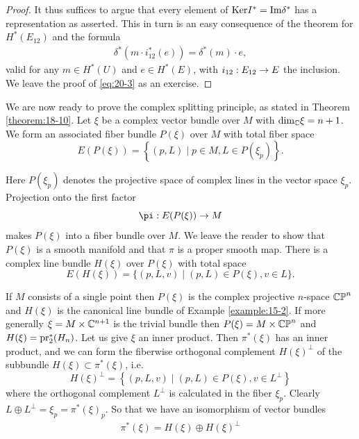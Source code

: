 \begin{proof}
  It thus suffices to argue that every element of $\mathrm{Ker}{I}^* = \mathrm{Im}{\delta }^*$ has 
  a representation as asserted. This in turn is an easy consequence of the theorem for $H^*( E_{12})$ 
  and the formula
  \begin{align}\label{eq:20-3}
    {\delta }^*( {m \cdot  {i}_{12}^*( e) })  = {\delta }^*( m)  \cdot  e,
  \end{align}
  valid for any $m \in  H^*( U)$ and $e \in  H^*( E)$, with ${i}_{12} : E_{12} \rightarrow  E$ the inclusion. 
  We leave the proof of \eqref{eq:20-3} as an exercise.
\end{proof}

We are now ready to prove the complex splitting principle, as stated in Theorem \ref{theorem:18-10}. 
Let $\xi$ be a complex vector bundle over $M$ with ${\dim }_{\mathbb{C}}\xi  = n + 1$. We form an associated 
fiber bundle $P( \xi )$ over $M$ with total fiber space
\[
  E( {P( \xi ) })  = \left\{  {( {p,L})  \mid  p \in  M,L \in  P( {\xi_p}) }\right\} .
\]

Here $P( {\xi_p})$ denotes the projective space of complex lines in the vector space ${\xi_p}$. Projection 
onto the first factor
\[
  \pi: E( {P( \xi ) })  \ra  M
\]
makes $P( \xi )$ into a fiber bundle over $M$. We leave the reader to show that $P( \xi )$ is a smooth manifold 
and that $\pi$ is a proper smooth map. There is a complex line bundle $H( \xi )$ over $P( \xi )$ with total space
\[
  E( {H( \xi ) })  = \{ ( {p,L,v})  \mid  ( {p,L})  \in  P( \xi ),v \in  L\}.
\]

If $M$ consists of a single point then $P( \xi )$ is the complex projective $n$-space ${\mathbb{CP}^n}$ and $H( \xi )$ 
is the canonical line bundle of Example \ref{example:15-2}. If more generally $\xi  = M \times  {\ensuremath{\mathbb{C}}}^{n + 1}$ is the trivial 
bundle then $P( \xi )  = M \times  {\mathbb{CP}^n}$ and $H( \xi )  = {\mathrm{pr}}_{2}^*( H_{n})$. Let us give $\xi$ 
an inner product. Then ${\pi }^*( \xi )$ has an inner product, and we can form the fiberwise orthogonal 
complement $H{( \xi ) }^{ \bot  }$ of the subbundle $H( \xi )  \subset  {\pi }^*( \xi )$, i.e.
\[
  H{( \xi ) }^{ \bot  } = \left\{  {( {p,L,v})  \mid  ( {p,L})  \in  P( \xi ),v \in  {L}^{ \bot  }}\right\}
\]
where the orthogonal complement ${L}^{ \bot  }$ is calculated in the fiber ${\xi_p}$. 
Clearly $L \oplus  {L}^{ \bot  } = {\xi_p} = {\pi }^*{( \xi ) }_{p}$. So that we have 
an isomorphism of vector bundles
\begin{align}\label{eq:20-4}
  {\pi }^*( \xi )  = H( \xi )  \oplus  H{( \xi ) }^{ \bot  }
\end{align}

